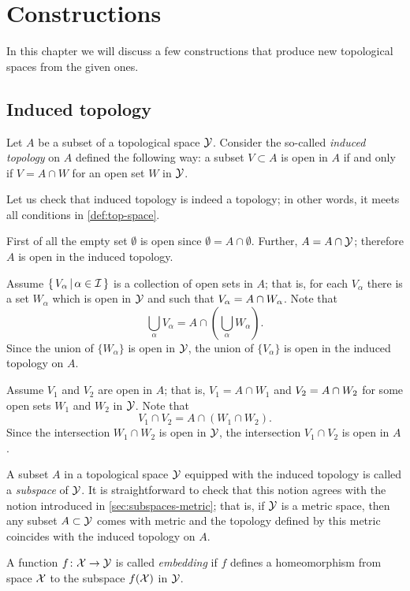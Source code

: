 \chapter{Constructions}

In this chapter we will discuss a few constructions that produce new topological spaces from the given ones.

\section{Induced topology}\label{sec:induced-topology}

Let $A$ be a subset of a topological space $\mathcal{Y}$.
Consider the so-called \emph{induced topology} on $A$ defined the following way:
a subset $V\subset A$ is open in $A$ if and only if $V=A\cap W$ for an open set $W$ in $\mathcal{Y}$.

Let us check that induced topology is indeed a topology;
in other words, it meets all conditions in \ref{def:top-space}.

First of all the empty set
$\emptyset$ is open since $\emptyset=A\cap \emptyset$.
Further, $A=A\cap \mathcal{Y}$;
therefore $A$ is open in the induced topology.

Assume $\left\{\,{V_\alpha}\,\middle|\,{\alpha\in\mathcal{I}}\,\right\}$ is a collection of open sets in $A$;
that is, for each $V_\alpha$ there is a set $W_\alpha$ which is open in $\mathcal{Y}$ and such that $V_\alpha\z=A\cap W_\alpha$.
Note that
\[\bigcup_\alpha V_\alpha=A\cap\left(\bigcup_\alpha W_\alpha\right).\]
Since the union of $\{W_\alpha\}$ is open in $\mathcal{Y}$, the union of $\{V_\alpha\}$ is open in the induced topology on $A$.

Assume $V_1$ and $V_2$ are open in $A$; 
that is, $V_1=A\cap W_1$ and  $V_2\z=A\cap W_2$ for some open sets $W_1$ and $W_2$ in $\mathcal{Y}$.
Note that
\[V_1\cap V_2=A\cap(W_1\cap W_2).\]
Since the intersection $W_1\cap W_2$ is open in $\mathcal{Y}$,
the intersection $V_1\cap V_2$ is open in $A$.


A subset $A$ in a topological space $\mathcal{Y}$ equipped with the induced topology is called a \emph{subspace} of $\mathcal{Y}$.
It is straightforward to check that this notion agrees with the notion introduced in \ref{sec:subspaces-metric};
that is, if $\mathcal{Y}$ is a metric space, then any subset $A\subset\mathcal{Y}$ comes with metric
and the topology defined by this metric coincides with the induced topology on $A$.

A function $f\colon\mathcal{X}\to \mathcal{Y}$ is called \emph{embedding} if $f$ defines a homeomorphism from space $\mathcal{X}$ to the subspace $f(\mathcal{X})$ in $\mathcal{Y}$.

